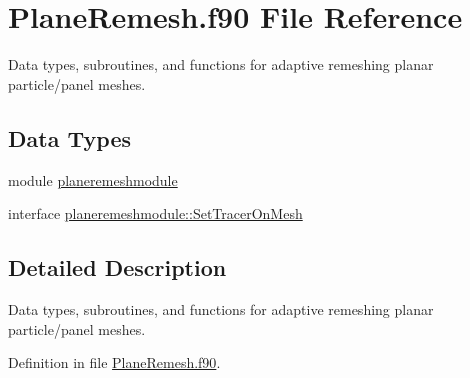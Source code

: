 \hypertarget{PlaneRemesh_8f90}{\section{Plane\+Remesh.\+f90 File Reference}
\label{PlaneRemesh_8f90}
}


Data types, subroutines, and functions for adaptive remeshing planar particle/panel meshes.  


\subsection*{Data Types}
\begin{DoxyCompactItemize}
\item 
module \hyperlink{classplaneremeshmodule}{planeremeshmodule}
\item 
interface \hyperlink{interfaceplaneremeshmodule_1_1SetTracerOnMesh}{planeremeshmodule\+::\+Set\+Tracer\+On\+Mesh}
\end{DoxyCompactItemize}


\subsection{Detailed Description}
Data types, subroutines, and functions for adaptive remeshing planar particle/panel meshes. 



Definition in file \hyperlink{PlaneRemesh_8f90_source}{Plane\+Remesh.\+f90}.

